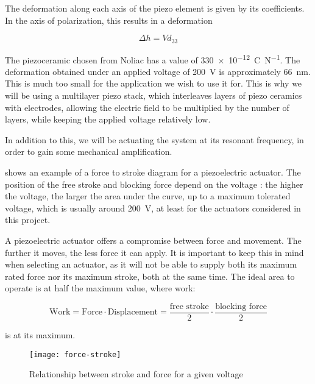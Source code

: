 The deformation along each axis of the piezo element is given by its
coefficients. In the axis of polarization, this results in a deformation

\begin{equation}
  \Delta h = V d_{33}
  \label{eq:delta-h}
\end{equation}

The piezoceramic chosen from Noliac has a value of
\SI{330e-12}{\coulomb\per\newton}. The deformation obtained
under an applied voltage of \SI{200}{\volt} is approximately
\SI{66}{\nano\metre}. This is much too small for the application we wish to use
it for. This is why we will be using a multilayer piezo stack, which interleaves
layers of piezo ceramics with electrodes, allowing the electric field to be
multiplied by the number of layers, while keeping the applied voltage relatively
low. 

In addition to this, we will be actuating the system at its resonant frequency,
in order to gain some mechanical amplification.

 shows an example of a force to stroke diagram for a
piezoelectric actuator. The position of the free stroke and blocking force
depend on the voltage : the higher the voltage, the larger the area under the
curve, up to a maximum tolerated voltage, which is usually around
\SI{200}{\volt}, at least for the actuators considered in this project.

A piezoelectric actuator offers a compromise between force and movement. The
further it moves, the less force it can apply. It is important to keep this in
mind when selecting an actuator, as it will not be able to supply both its
maximum rated force nor its maximum stroke, both at the same time. The ideal
area to operate is at half the maximum value, where work:

\begin{equation}
  \mathrm{Work = Force \cdot Displacement} = 
  \frac{\textrm{free stroke}}{2} \cdot \frac{\textrm{blocking force}}{2}
  \label{eq:work}
\end{equation}

is at its maximum.

\begin{figure}[h!]
  \begin{center}
    \texttt{[image: force-stroke]}
  \end{center}
  \caption{Relationship between stroke and force for a given voltage}
  \label{fig:force-stroke}
\end{figure}


